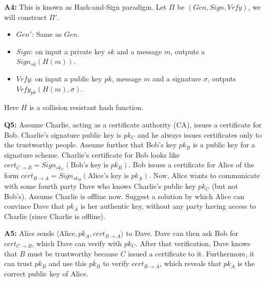 \documentclass[12pt,reqno]{amsart}
\begin{document}
\textbf{A4:} This is known as Hash-and-Sign paradigm. Let $\Pi$ be $(Gen, Sign, Vrfy)$, we will construct $\Pi'$.
\begin{itemize}
	\item $Gen'$: Same as $Gen$.
	\item $Sign$: on input a private key $sk$ and a message $m$, outputs a $Sign_{sk}(H(m))$.
	\item $Vrfy$: on input a public key $pk$, message $m$ and a signature $\sigma$, outputs $Vrfy_{pk}(H(m),\sigma)$.
\end{itemize}
Here $H$ is a collision resistant hash function. 

\vspace{20px}
\textbf{Q5:} Assume Charlie, acting as a certificate authority (CA), issues a certificate for Bob. Charlie’s signature public key is $pk_C$ and he always issues certificates only to the trustworthy people. Assume further that Bob’s key $pk_B$ is a public key for a signature scheme. Charlie’s certificate for Bob looks like $cert_{C\rightarrow B} = Sign_{sk_C}(\text{Bob’s key is }pk_B)$.
Bob issues a certificate for Alice of the form $cert_{B \rightarrow A} = Sign_{sk_B}(\text{Alice’s key is }pk_A)$.
Now, Alice wants to communicate with some fourth party Dave who knows Charlie’s public key $pk_C$ (but not Bob’s). Assume Charlie is offline now. Suggest a solution by which Alice can convince Dave that $pk_A$ is her authentic key, without any party having access to Charlie (since Charlie is offline).

\textbf{A5:} Alice sends $\langle \textrm{Alice}, pk_A, cert_{B \to A} \rangle$ to Dave. Dave can then ask Bob for $cert_{C \to B}$, which Dave can verify with $pk_C$. After that verification, Dave knows that $B$ must be trustworthy because $C$ issued a certificate to it. Furthermore, it can trust $pk_B$ and use this $pk_B$ to verify $cert_{B \to A}$, which reveals that $pk_A$ is the correct public key of Alice.
\end{document}
